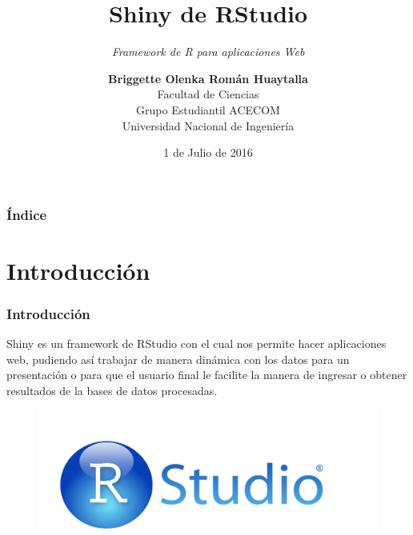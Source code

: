 \documentclass{beamer}
\date{1 de Julio de 2016}
\title{\textbf{Shiny de RStudio}}
\subtitle{\textit{Framework de R para aplicaciones Web}}
\author[Briggette Román]{\textbf{Briggette Olenka Román Huaytalla}\\Facultad de Ciencias\\Grupo Estudiantil ACECOM\\Universidad Nacional de Ingeniería}
\begin{document}
	\maketitle
	
\begin{frame}
	\frametitle{Índice}
	\begin{multicols}{2}
		\tableofcontents
	\end{multicols} 
\end{frame}

\section{Introducción}
\begin{frame}
    \frametitle{Introducción}
    Shiny es un framework de RStudio con el cual nos permite hacer aplicaciones web, pudiendo así trabajar de manera dinámica con los datos para un presentación o para que el usuario final le facilite la manera de ingresar o obtener resultados de la bases de datos procesadas.
    \begin{figure}[h!]
    	\includegraphics[scale=0.1]{rstudio}
    \end{figure}
\end{frame}
\end{document}
